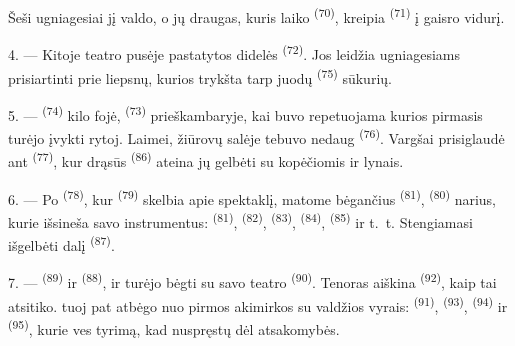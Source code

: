 Šeši ugniagesiai jį valdo, o jų draugas, kuris laiko 
\textsuperscript{(70)}, kreipia  \textsuperscript{(71)} į gaisro
vidurį.

4. --- Kitoje teatro pusėje pastatytos didelės 
\textsuperscript{(72)}. Jos leidžia ugniagesiams prisiartinti prie liepsnų, kurios
trykšta tarp juodų  \textsuperscript{(75)} sūkurių.

\VUsaut{5.0mm}
\VUsaut{3.4mm}

5. ---  \textsuperscript{(74)} kilo fojė, 
\textsuperscript{(73)} prieškambaryje, kai buvo repetuojama  kurios
pirmasis  turėjo įvykti rytoj. Laimei, žiūrovų salėje tebuvo
nedaug  \textsuperscript{(76)}. Vargšai prisiglaudė ant
 \textsuperscript{(77)}, kur drąsūs 
\textsuperscript{(86)} ateina jų gelbėti su kopėčiomis ir lynais.

6. --- Po  \textsuperscript{(78)}, kur 
\textsuperscript{(79)} skelbia apie spektaklį, matome bėgančius 
\textsuperscript{(81)},  \textsuperscript{(80)} narius, kurie
išsineša savo instrumentus:  \textsuperscript{(81)},
 \textsuperscript{(82)},  \textsuperscript{(83)},
 \textsuperscript{(84)},  \textsuperscript{(85)} ir
t.~t. Stengiamasi išgelbėti dalį  \textsuperscript{(87)}.

7. ---  \textsuperscript{(89)} ir 
\textsuperscript{(88)},  ir  turėjo bėgti su
savo teatro  \textsuperscript{(90)}. Tenoras aiškina
 \textsuperscript{(92)}, kaip tai atsitiko. 
tuoj pat atbėgo nuo pirmos akimirkos su valdžios vyrais:  \textsuperscript{(91)},  \textsuperscript{(93)},
 \textsuperscript{(94)} ir 
\textsuperscript{(95)}, kurie ves tyrimą, kad nuspręstų dėl atsakomybės.

\VUsaut{6.0mm}
\VUfilet{22mm}
